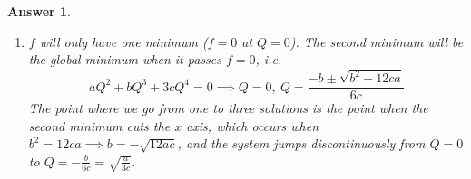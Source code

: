 \documentclass[a4paper]{article}
\DeclareMathOperator{\Tr}{Tr}
\newtheorem{ans}{Answer}[section]
\theoremstyle{new}
\begin{document}
\begin{ans}
\begin{enumerate}[label=(\alph*)]
\begin{align}
    &\Tr(S\cdot S\cdot S\cdot S)\nonumber\\&=S_{\alpha\beta}S_{\beta\gamma}S_{\gamma\delta}S_{\delta\alpha}\nonumber\\&=Q^4(3n_\alpha n_\beta-\delta_{\alpha\beta})(3n_\beta n_\gamma-\delta_{\beta\gamma})(3n_\gamma n_\delta-\delta_{\gamma\delta})(3n_\delta n_\alpha-\delta_{\delta\alpha})\nonumber\\&=Q^4((9n_\alpha n_\beta n_\gamma n_\beta-3n_\alpha n_\beta\delta_{\beta\gamma}-3n_\beta n_\gamma\delta_{\alpha\beta}+\delta_{\alpha\beta}\delta_{\beta\gamma})(9n_\gamma n_\delta n_\delta n_\alpha-3n_\alpha n_\delta\delta_{\delta\gamma}-3n_\delta n_\gamma\delta_{\alpha\delta}+\delta_{\alpha\delta}\delta_{\delta\gamma})\nonumber\\&=Q^4(81-27-27+9-27+9+9-3-27+9+9-3+9-3-3+3)\nonumber\\&=18Q^4\nonumber
\end{align}
So the free energy is
$$f=a\Tr(S\cdot S)+b\Tr(S\cdot S\cdot S)+c\Tr(S\cdot S\cdot S\cdot S)=6aQ^2+6bQ^3+18cQ^4$$
If $b=0$, this is a simple symmetric energy with a single minimum. As $b$ is reduced below 0, the energy loses symmetry, and eventually a second minimum appears at positive $Q$. At some value of $b$, it becomes the global minimum. The transition is thus discontinuous.
\item $f$ will only have one minimum ($f=0$ at $Q=0$). The second minimum will be the global minimum when it passes $f=0$, i.e.
$$aQ^2+bQ^3+3cQ^4=0\implies Q=0,~Q=\frac{-b\pm\sqrt{b^2-12ca}}{6c}$$
The point where we go from one to three solutions is the point when the second minimum cuts the $x$ axis, which occurs when $b^2=12ca\implies b=-\sqrt{12ac}$, and the system jumps discontinuously from $Q=0$ to $Q=-\frac{b}{6c}=\sqrt{\frac{a}{3c}}$.
\end{enumerate}
\end{ans}
\newpage
\end{document}
